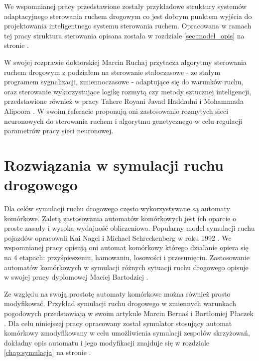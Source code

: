 We wspomnianej pracy przedstawione zostały przykładowe struktury systemów adaptacyjnego sterowania ruchem drogowym co jest dobrym punktem wyjścia do projektowania inteligentnego systemu sterowania ruchem. Opracowana w ramach tej pracy struktura sterowania opisana została w rozdziale \ref{sec:model_opis} na stronie \pageref{sec:model_opis}.

W swojej rozprawie doktorskiej \cite{ruchaj} Marcin Ruchaj przytacza algorytmy sterowania ruchem drogowym z podziałem na sterowanie stałoczasowe - ze stałym programem sygnalizacji, zmiennoczasowe - adaptujące się do warunków ruchu, oraz sterowanie wykorzystujące logikę rozmytą czy metody sztucznej inteligencji, przedstawione również w pracy Tahere Royani Javad Haddadni i Mohammada Alipoora \cite{royani+haddadnia+alipoor}. W swoim referacie proponują oni zastosowanie rozmytych sieci neuronowych do sterowania ruchem i algorytmu genetycznego w celu regulacji parametrów pracy sieci neuronowej.

\section{Rozwiązania w symulacji ruchu drogowego}
Dla celów symulacji ruchu drogowego często wykorzystywane są automaty komórkowe. Zaletą zastosowania automatów komórkowych jest ich oparcie o proste zasady i wysoka wydajność obliczeniowa. Popularny model symulacji ruchu pojazdów opracowali Kai Nagel i Michael Schreckenberg w roku 1992 \cite{nasch}. We wspomnianej pracy opisują oni automat komórkowy którego działanie opiera się na 4 etapach: przyśpieszeniu, hamowaniu, losowości i przesunięciu. Zastosowanie automatów komórkowych w symulacji różnych sytuacji ruchu drogowego opisuje w swojej pracy dyplomowej Maciej Bartodziej \cite{bartodziej}.

Ze względu na swoją prostotę automaty komórkowe można również prosto modyfikować. Przykład symulacji ruchu drogowego w zmiennych warunkach pogodowych przedstawiają w swoim artykule Marcin Bernaś i Bartłomiej Płaczek \cite{bernas+placzek}. Dla celu niniejszej pracy opracowany został symulator stosujący automat komórkowy zmodyfikowany w celu umożliwienia symulacji zespołów skrzyżowań, dokładny opis automatu i jego modyfikacji znajduje się w rozdziale \ref{chap:symulacja} na stronie \pageref{chap:symulacja}.

